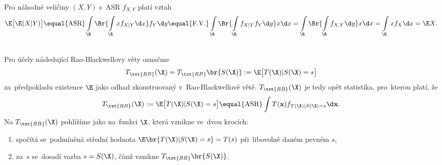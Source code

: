 \begin{theorem}
	Pro náhodné veličiny $(X,Y)$ s~ASR $f_{X,Y}$ platí vztah
	$$ \E\big[\E(X|Y)\big]\equal{\text{ASR}}\int\limits_{\R} \Br{\int\limits_{\R} xf_{X|Y} \d x} f_Y\d y \equal{\text{F.V.}}\int\limits_{\R}\Br{\int\limits_{\R} f_{X|Y}f_Y\d y}x\d x=\int\limits_{\R}\Br{\int\limits_{\R} f_{X,Y}\d y}x\d x=\int\limits_{\R} xf_X\d x=\E X. $$	
\end{theorem}
 ~\\
Pro účely následující Rao-Blackwellovy věty označme $$T_{\txt{RB}}(\X)=T_{\txt{RB}}\br{S(\X)}:=\E\big[ T(\X)|S(\X)=s \big]$$ za~předpokladu existence $\E$ jako odhad zkonstruovaný v~Rao-Blackwellově větě. 
$T_{\txt{RB}}(\X)$ je tedy opět statistika, pro~kterou platí, že $$ T_{\txt{RB}}(\X):=\E\big[ T(\X)|S(\X)=s \big]\equal{\text{ASR}}\int T(\textbf{x})f_{T(\X)|S(\X)=s} \d \textbf{x}.$$
Na $T_\txt{RB}(\X)$ pohlížíme jako na~funkci $\X$, která vznikne ve~dvou krocích:\begin{enumerate}
		\item spočítá se~podmíněná střední hodnota $\E\br{T(\X)|S(\X)=s}=T(s)$ při~libovolně daném pevném $s$,
		\item za~$s$ se~dosadí vazba $s=S(\X)$, čímž vznikne $T_\txt{RB}\br{S(\X)}$.
	\end{enumerate}


